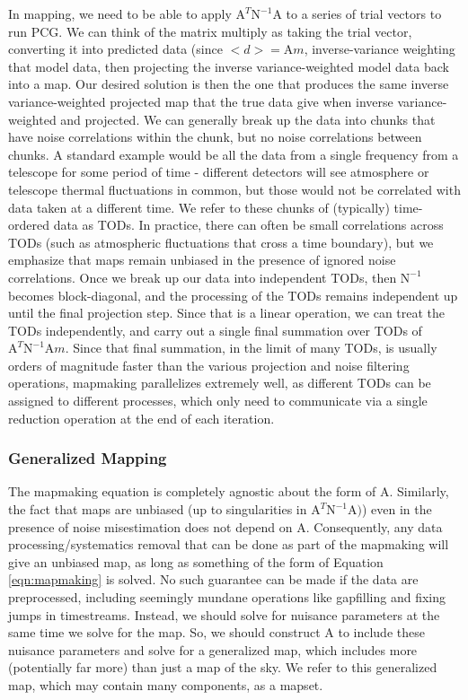 \documentclass[12]{article}
\begin{document}
In mapping, we need to be able to apply $\mathrm{A}^T \mathrm{N}^{-1}
\mathrm{A}$ to a series of trial vectors to run PCG.  We can think of
the matrix multiply as taking the trial vector, converting it into
predicted data (since $<d>=\mathrm{A}m$, inverse-variance weighting
that model data, then projecting the inverse variance-weighted model
data back into a map.  Our desired solution is then the one that
produces the same inverse variance-weighted projected map that the
true data give when inverse variance-weighted and projected.  We can
generally break up the data into chunks that have noise correlations
within the chunk, but no noise correlations between chunks.  A
standard example would be all the data from a single frequency from a
telescope for some period of time - different detectors will see
atmosphere or telescope thermal fluctuations in common, but those
would not be correlated with data taken at a different time.  We refer
to these chunks of (typically) time-ordered data as TODs.  In
practice, there can often be small correlations across TODs (such as
atmospheric fluctuations that cross a time boundary), but we emphasize
that maps remain unbiased in the presence of ignored noise
correlations.  Once we break up our data into independent TODs, then
$\mathrm{N}^{-1}$ becomes block-diagonal, and the processing of the
TODs remains independent up until the final projection step.  Since
that is a linear operation, we can treat the TODs independently, and
carry out a single final summation over TODs of $\mathrm{A}^T
\mathrm{N}^{-1} \mathrm{A}m$. Since that final summation, in the limit
of many TODs, is usually orders of magnitude faster than the various
projection and noise filtering operations, mapmaking parallelizes
extremely well, as different TODs can be assigned to different
processes, which only need to communicate via a single reduction
operation at the end of each iteration.


\subsubsection{Generalized Mapping}

The mapmaking equation is completely agnostic about the form of
$\mathrm{A}$.  Similarly, the fact that maps are unbiased (up to
singularities in $\mathrm{A}^T \mathrm{N}^{-1} \mathrm{A})$) even in
the presence of noise misestimation does not depend on $\mathrm{A}$.
Consequently, any data processing/systematics removal that can be done
as part of the mapmaking will give an unbiased map, as long as
something of the form of Equation \ref{eqn:mapmaking} is solved.  No
such guarantee can be made if the data are preprocessed, including
seemingly mundane operations like gapfilling and fixing jumps in
timestreams.  Instead, we should solve for nuisance parameters at the
same time we solve for the map.  So, we should construct $\mathrm{A}$
to include these nuisance parameters and solve for a generalized map,
which includes more (potentially far more) than just a map of the
sky.  We refer to this generalized map, which may contain many
components, as a mapset.
\end{document}
